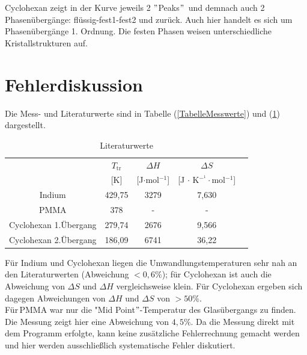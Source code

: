 \documentclass[12pt,a4paper,titlepage,headinclude,bibtotoc]{scrartcl}
\begin{document}
Cyclohexan zeigt in der Kurve jeweils 2 $"$Peaks$"$\, und demnach auch 2 Phasenübergänge: flüssig-fest1-fest2 und zurück. Auch hier handelt es sich um Phasenübergänge 1. Ordnung. Die festen Phasen weisen unterschiedliche Kristallstrukturen auf.\\
 
\section{Fehlerdiskussion}

Die Mess- und Literaturwerte sind in Tabelle (\ref{TabelleMesswerte}) und (\ref{TabelleLiteraturwerte}) dargestellt.


\begin{table} [h!] \label{TabelleLiteraturwerte}
\caption{Literaturwerte} %
\begin{tabular}{c|c|c|c|c}
  & $T_\mathrm{tr}$  & $\Delta H$  & $\Delta S$ \\ 
 & [K] & [J$\cdot$mol$^{-1}$] & [J $\cdot$ K$^{-^1}\cdot$mol$^{-1}$] \\
\hline 
Indium & 429,75 \footnotemark &3279 & 7,630 \\ 
\hline 
PMMA & 378\footnotemark& - & -  \\ 
\hline
Cyclohexan 1.Übergang &  279,74 \footnotemark &2676& 9,566\\ 
Cyclohexan 2.Übergang & 186,09 \footnotemark &6741& 36,22\\ 
\end{tabular}
\end{table}
\FloatBarrier


Für Indium und Cyclohexan liegen die Umwandlungstemperaturen sehr nah an den Literaturwerten (Abweichung $< 0,6\% $); für Cyclohexan ist auch die Abweichung von $\Delta S$ und $\Delta H$ vergleichsweise klein. Für Cyclohexan ergeben sich dagegen Abweichungen von $\Delta H$ und $\Delta S$ von $> 50\%$.\\
Für\,PMMA war nur die "Mid Point$"$-Temperatur des Glasübergangs zu finden. Die Messung zeigt hier eine Abweichung von $4,5\%$.
Da die Messung direkt mit dem Programm erfolgte, kann keine zusätzliche Fehlerrechnung gemacht werden und hier werden ausschließlich systematische Fehler diskutiert.\\
\end{document}
